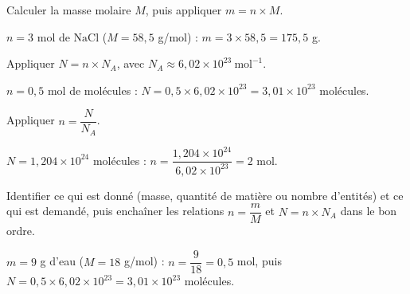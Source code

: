 Calculer la masse molaire $M$, puis appliquer $m=n\times M$.
\begin{exemple}
$n=3$ mol de $\mathrm{NaCl}$ ($M=58{,}5$ g/mol) : $m=3\times58{,}5=175{,}5$ g.
\end{exemple}

Appliquer $N=n\times N_A$, avec $N_A\approx6{,}02\times10^{23}\ \text{mol}^{-1}$.
\begin{exemple}
$n=0{,}5$ mol de molécules : $N=0{,}5\times6{,}02\times10^{23}=3{,}01\times10^{23}$
molécules.
\end{exemple}

Appliquer $n=\dfrac{N}{N_A}$.
\begin{exemple}
$N=1{,}204\times10^{24}$ molécules : $n=\dfrac{1{,}204\times10^{24}}{6{,}02\times10^{23}}=2$
mol.
\end{exemple}

Identifier ce qui est donné (masse, quantité de matière ou nombre d'entités) et ce qui est
demandé, puis enchaîner les relations $n=\dfrac mM$ et $N=n\times N_A$ dans le bon ordre.
\begin{exemple}
$m=9$ g d'eau ($M=18$ g/mol) : $n=\dfrac9{18}=0{,}5$ mol, puis
$N=0{,}5\times6{,}02\times10^{23}=3{,}01\times10^{23}$ molécules.
\end{exemple}

